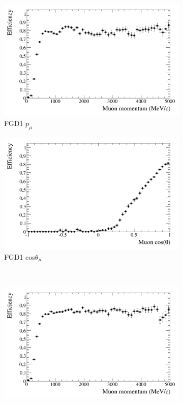 \begin{figure}
\centering
\begin{subfigure}{.49\textwidth}
  \centering
  \includegraphics[width=1.0\linewidth]{figs/effmomfgd1nuinnubar}
  \caption{FGD1 $p_{\mu}$}
\end{subfigure}
\begin{subfigure}{.49\textwidth}
  \centering
  \includegraphics[width=1.0\linewidth]{figs/effcosfgd1nuinnubar}
  \caption{FGD1 cos$\theta_{\mu}$}
\end{subfigure} \\
\begin{subfigure}{.49\textwidth}
  \centering
  \includegraphics[width=1.0\linewidth]{figs/effmomfgd2nuinnubar}

\end{subfigure}
\end{figure}
